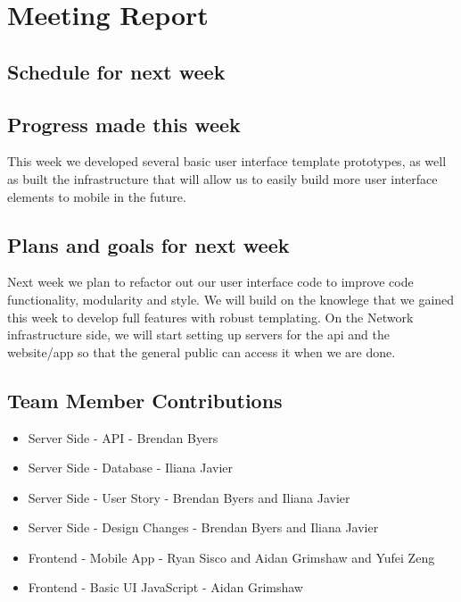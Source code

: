 \documentclass[12pt]{article}
\begin{document}
\section{Meeting Report}
\subsection{Schedule for next week}

\subsection{Progress made this week}
This week we developed several basic user interface template prototypes, as well as built the infrastructure that will allow us to easily build more user interface elements to mobile in the future.
\subsection{Plans and goals for next week}
Next week we plan to refactor out our user interface code to improve code functionality, modularity and style. We will build on the knowlege that we gained this week to develop full features with robust templating. On the Network infrastructure side, we will start setting up servers for the api and the website/app so that the general public can access it when we are done.
\subsection{Team Member Contributions}
\begin{itemize}
      \item Server Side - API - Brendan Byers
      \item Server Side - Database - Iliana Javier
      \item Server Side - User Story - Brendan Byers and Iliana Javier
      \item Server Side - Design Changes - Brendan Byers and Iliana Javier
      \item Frontend - Mobile App - Ryan Sisco and Aidan Grimshaw and Yufei Zeng
      \item Frontend - Basic UI JavaScript - Aidan Grimshaw
\end{itemize}
\end{document}
